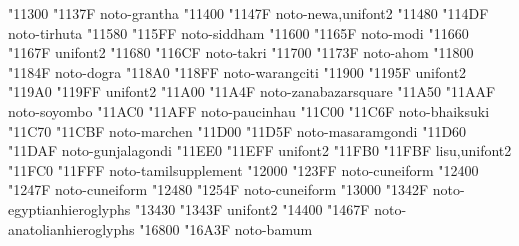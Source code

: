 \documentclass{article}
\begin{document}
                                        { "11300} { "1137F} {noto-grantha}
                                           { "11400} { "1147F} {noto-newa,unifont2}
                                        { "11480} { "114DF} {noto-tirhuta}
                                        { "11580} { "115FF} {noto-siddham}
                                           { "11600} { "1165F} {noto-modi}
                           { "11660} { "1167F} {unifont2}
                                          { "11680} { "116CF} {noto-takri}
                                           { "11700} { "1173F} {noto-ahom}
                                          { "11800} { "1184F} {noto-dogra}
                                    { "118A0} { "118FF} {noto-warangciti}
                                    { "11900} { "1195F} {unifont2}
                                    { "119A0} { "119FF} {unifont2}
                               { "11A00} { "11A4F} {noto-zanabazarsquare}
                                        { "11A50} { "11AAF} {noto-soyombo}
                                    { "11AC0} { "11AFF} {noto-paucinhau}
                                      { "11C00} { "11C6F} {noto-bhaiksuki}
                                        { "11C70} { "11CBF} {noto-marchen}
                                  { "11D00} { "11D5F} {noto-masaramgondi}
                                  { "11D60} { "11DAF} {noto-gunjalagondi}
                                        { "11EE0} { "11EFF} {unifont2}
                                { "11FB0} { "11FBF} {lisu,unifont2}
                               { "11FC0} { "11FFF} {noto-tamilsupplement}
                                      { "12000} { "123FF} {noto-cuneiform}
              { "12400} { "1247F} {noto-cuneiform}
                       { "12480} { "1254F} {noto-cuneiform}
                           { "13000} { "1342F} {noto-egyptianhieroglyphs}
            { "13430} { "1343F} {unifont2}
                          { "14400} { "1467F} {noto-anatolianhieroglyphs}
                               { "16800} { "16A3F} {noto-bamum}
\end{document}
